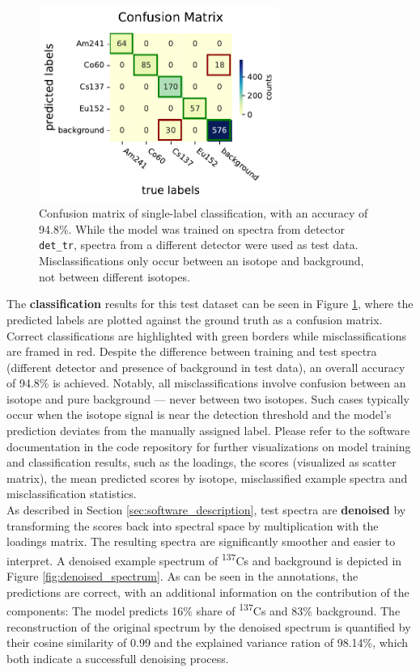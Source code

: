 \documentclass[preprint, 12pt, a4paper]{elsarticle}
\begin{document}
\begin{figure}
\centering
\includegraphics[width=0.7\textwidth]{Confusion_matrix_.pdf}
\caption{Confusion matrix of single-label classification, with an accuracy of 94.8\%. While the model was trained on spectra from detector \texttt{det\_tr}, spectra from a different detector were used as test data. Misclassifications only occur between an isotope and background, not between different isotopes.}
\label{fig:confusion_matrix}
\end{figure}

The \textbf{classification} results for this test dataset can be seen in Figure \ref{fig:confusion_matrix}, where the predicted labels are plotted against the ground truth as a confusion matrix. Correct classifications are highlighted with green borders while misclassifications are framed in red. Despite the difference between training and test spectra (different detector and presence of background in test data), an overall accuracy of 94.8\% is achieved. Notably, all misclassifications involve confusion between an isotope and pure background — never between two isotopes. Such cases typically occur when the isotope signal is near the detection threshold and the model's prediction deviates from the manually assigned label. Please refer to the software documentation in the code repository for further visualizations on model training and classification results, such as the loadings, the scores (visualized as scatter matrix), the mean predicted scores by isotope, misclassified example spectra and misclassification statistics. \\

As described in Section \ref{sec:software_description}, test spectra are \textbf{denoised} by transforming the scores back into spectral space by multiplication with the loadings matrix. The resulting spectra are significantly smoother and easier to interpret. A denoised example spectrum of \textsuperscript{137}Cs and background is depicted in Figure \ref{fig:denoised_spectrum}. As can be seen in the annotations, the predictions are correct, with an additional information on the contribution of the components: The model predicts 16\% share of \textsuperscript{137}Cs and 83\% background. The reconstruction of the original spectrum by the denoised spectrum is quantified by their cosine similarity of 0.99 and the explained variance ration of 98.14\%, which both indicate a successfull denoising process. \\
\end{document}
